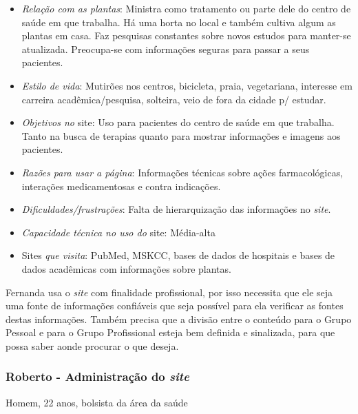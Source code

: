 \begin{itemize}
\item
  \emph{Relação com as plantas}: Ministra como tratamento ou parte dele do centro de saúde em que trabalha. Há uma horta no local e também cultiva algum as plantas em casa. Faz pesquisas constantes sobre novos estudos para manter-se atualizada. Preocupa-se com informações seguras para passar a seus pacientes.
\item
  \emph{Estilo de vida}: Mutirões nos centros, bicicleta, praia, vegetariana, interesse em carreira acadêmica/pesquisa, solteira, veio de fora da cidade p/ estudar.
\item
  \emph{Objetivos no} site: Uso para pacientes do centro de saúde em que trabalha. Tanto na busca de terapias quanto para mostrar informações e imagens aos pacientes.
\item
  \emph{Razões para usar a página}: Informações técnicas sobre ações farmacológicas, interações medicamentosas e contra indicações.
\item
  \emph{Dificuldades/frustrações}: Falta de hierarquização das informações no \emph{site}.
\item
  \emph{Capacidade técnica no uso do} site: Média-alta
\item
  Sites \emph{que visita}: PubMed, MSKCC, bases de dados de hospitais e bases de dados acadêmicas com informações sobre plantas.
\end{itemize}

Fernanda usa o \emph{site} com finalidade profissional, por isso necessita que ele seja uma fonte de informações confiáveis que seja possível para ela verificar as fontes destas informações. Também precisa que a divisão entre o conteúdo para o Grupo Pessoal e para o Grupo Profissional esteja bem definida e sinalizada, para que possa saber aonde procurar o que deseja.

\subsubsection{Roberto - Administração do \emph{site}}

Homem, 22 anos, bolsista da área da saúde

